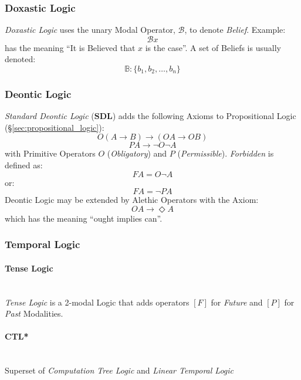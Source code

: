 \subsubsection{Doxastic Logic}\label{sec:doxastic_logic}

\emph{Doxastic Logic} uses the unary Modal Operator, $\mathcal{B}$, to
denote \emph{Belief}. Example:
\[
    \mathcal{B} x
\]
has the meaning ``It is Believed that $x$ is the case''. A set of
Beliefs is usually denoted:
\[
    \mathbb{B}: \{ b_1, b_2, \ldots, b_n \}
\]



\subsubsection{Deontic Logic}\label{sec:deontic_logic}

\emph{Standard Deontic Logic} ($\mathbf{SDL}$) adds the following
Axioms to Propositional Logic (\S\ref{sec:propositional_logic}):
  \[O(A \rightarrow B) \rightarrow (OA \rightarrow OB)\]
  \[PA \rightarrow \neg O \neg A\]
with Primitive Operators $O$ (\emph{Obligatory}) and $P$
(\emph{Permissible}). \emph{Forbidden} is defined as:
  \[FA = O \neg A\]
or:
  \[FA = \neg P A\]
Deontic Logic may be extended by Alethic Operators with the Axiom:
  \[OA \rightarrow \Diamond A\]
which has the meaning ``ought implies can''.



\subsubsection{Temporal Logic}\label{sec:temporal_logic}

\paragraph{Tense Logic}\label{sec:tense_logic}
\hfill \\

\emph{Tense Logic} is a 2-modal Logic that adds operators $[F]$ for
\emph{Future} and $[P]$ for \emph{Past} Modalities.



\paragraph{CTL*}\label{sec:ctl_star}
\hfill \\

Superset of \emph{Computation Tree Logic} and \emph{Linear
  Temporal Logic}


